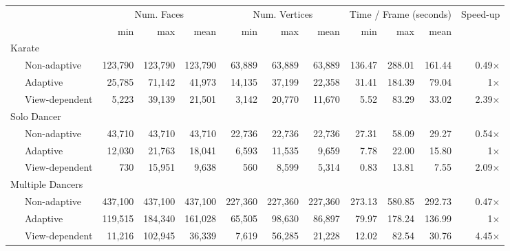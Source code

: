 \begin{tabular}{l|rrr|rrr|rrr|r}  %
\toprule
{} & \multicolumn{3}{c|}{Num. Faces} & \multicolumn{3}{c|}{Num. Vertices} & \multicolumn{3}{c|}{Time / Frame (seconds)} & Speed-up\\  %
{} & min & max & mean & min & max & mean & min & max &  mean & {}\\ %
\hline
Karate&&&&&&&&&&\\
~~~Non-adaptive   & 123,790 & 123,790 & 123,790 &  63,889 &  63,889 &  63,889 & 136.47 & 288.01 & 161.44 & 0.49$\times$\\
~~~Adaptive       &  25,785 &  71,142 &  41,973 &  14,135 &  37,199 &  22,358 &  31.41 & 184.39 &  79.04 &    1$\times$\\
~~~View-dependent &   5,223 &  39,139 &  21,501 &   3,142 &  20,770 &  11,670 &   5.52 &  83.29 &  33.02 & 2.39$\times$ \\[0.2cm]  %
Solo Dancer &&&&&&&&&&\\
~~~Non-adaptive   &  43,710 &  43,710 &  43,710 &  22,736 &  22,736 &  22,736 &  27.31 &  58.09 &  29.27 & 0.54$\times$\\
~~~Adaptive       &  12,030 &  21,763 &  18,041 &   6,593 &  11,535 &   9,659 &   7.78 &  22.00 &  15.80 &    1$\times$\\
~~~View-dependent &     730 &  15,951 &   9,638 &     560 &   8,599 &   5,314 &   0.83 &  13.81 &   7.55 & 2.09$\times$ \\[0.2cm]  %
Multiple Dancers &&&&&&&&&&\\
~~~Non-adaptive   & 437,100 & 437,100 & 437,100 & 227,360 & 227,360 & 227,360 & 273.13 & 580.85 & 292.73 & 0.47$\times$\\
~~~Adaptive       & 119,515 & 184,340 & 161,028 &  65,505 &  98,630 &  86,897 &  79.97 & 178.24 & 136.99 &    1$\times$\\
~~~View-dependent &  11,216 & 102,945 &  36,339 &   7,619 &  56,285 &  21,228 &  12.02 &  82.54 &  30.76 & 4.45$\times$\\
\bottomrule
\end{tabular}
